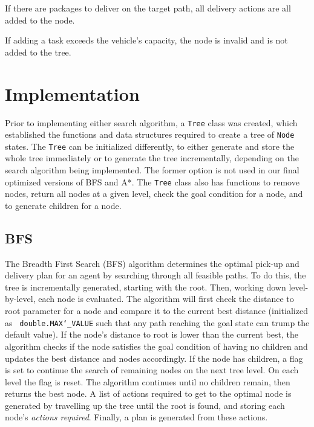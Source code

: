 \documentclass[11pt]{article}
\begin{document}
\begin{compactenum}
	\item If there are packages to deliver on the target path, all delivery actions are all added to the  node.
	\item If adding a task exceeds the vehicle's capacity, the node is invalid and is not added to the tree.
\end{compactenum}


\section{Implementation}
Prior to implementing either search algorithm, a \texttt{Tree} class was created, which established the functions and data structures required to create a tree of \texttt{Node} states. The \texttt{Tree} can be initialized differently, to either generate and store the whole tree immediately or to generate the tree incrementally, depending on the search algorithm being implemented. The former option is not used in our final optimized versions of BFS and A*. The \texttt{Tree} class also has functions to remove nodes, return all nodes at a given level, check the goal condition for a node, and to generate children for a node. 

\subsection{BFS}
The Breadth First Search (BFS) algorithm determines the optimal pick-up and delivery plan for an agent by searching through all feasible paths. To do this, the tree is incrementally generated, starting with the root. Then, working down level-by-level, each node is evaluated. The algorithm will first check the distance to root parameter for a node and compare it to the current best distance (initialized as \texttt{ double.MAX\char`_VALUE} such that any path reaching the goal state can trump the default value). If the node's distance to root is lower than the current best, the algorithm checks if the node satisfies the goal condition of having no children and updates the best distance and nodes accordingly. If the node has children, a flag is set to continue the search of remaining nodes on the next tree level. On each level the flag is reset. The algorithm continues until no children remain, then returns the best node. A list of actions required to get to the optimal node is generated by travelling up the tree until the root is found, and storing each node's \textit{actions required}. Finally, a plan is generated from these actions.
\end{document}
